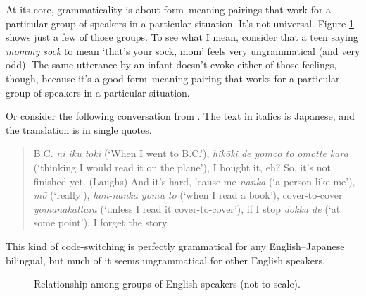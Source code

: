 At its core, grammaticality is about form--meaning pairings that work for a particular group of speakers in a particular situation. It's not universal. Figure \ref{fig:speaker_groups} shows just a few of those groups. To see what I mean, consider that a teen saying \textit{mommy sock} to mean `that's your sock, mom' feels very ungrammatical (and very odd). The same utterance by an infant doesn't evoke either of those feelings, though, because it's a good form--meaning pairing that works for a particular group of speakers in a particular situation.

Or consider the following conversation from \citet[179]{nishimura1995}. The text in italics is Japanese, and the translation is in single quotes.

\begin{quote}
    B.C. \textit{ni iku toki} (`When I went to B.C.'), \textit{hikōki de yomoo to omotte kara} (`thinking I would read it on the plane'), I bought it, eh? So, it's not finished yet. (Laughs) And it's hard, 'cause me\textit{-nanka} (`a person like me'), \textit{mō} (`really'), \textit{hon-nanka yomu to} (`when I read a book'), cover-to-cover \textit{yomanakattara} (`unless I read it cover-to-cover'), if I stop \textit{dokka de }(`at some point'), I forget the story.
\end{quote}

This kind of code-switching is perfectly grammatical for any English--Japanese bilingual, but much of it seems ungrammatical for other English speakers.

\begin{figure}[ht] \label{fig:speaker-groups}
\centering
{}
\caption{Relationship among groups of English speakers (not to scale).}
\label{fig:speaker_groups}
\end{figure}



